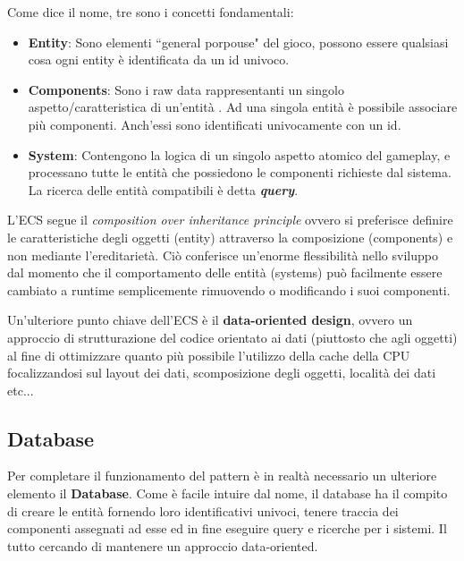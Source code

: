 Come dice il nome, tre sono i concetti fondamentali:

\begin{itemize}
	\item \textbf{Entity}: Sono elementi ``general porpouse" del gioco, possono essere qualsiasi cosa ogni entity è identificata da un id univoco.

	\item \textbf{Components}: Sono i raw data rappresentanti un singolo aspetto/caratteristica di un'entità . Ad una singola entità è possibile associare più componenti. Anch'essi sono identificati univocamente con un id.
	
	\item \textbf{System}: Contengono la logica di un singolo aspetto atomico del gameplay, e processano tutte le entità che possiedono le componenti richieste dal sistema. La ricerca delle entità compatibili è detta \textbf{\textit{query}}.
\end{itemize}

L'ECS segue il \textit{composition over inheritance principle} ovvero si preferisce definire le caratteristiche degli oggetti (entity) attraverso la composizione (components) e non mediante l'ereditarietà. Ciò conferisce un'enorme flessibilità nello sviluppo dal momento che il comportamento delle entità (systems) può facilmente essere cambiato a runtime semplicemente rimuovendo o modificando i suoi componenti.

Un'ulteriore punto chiave dell'ECS è il \textbf{data-oriented design}, ovvero un approccio di strutturazione del codice orientato ai dati (piuttosto che agli oggetti) al fine di ottimizzare quanto più possibile l'utilizzo della cache della CPU focalizzandosi sul layout dei dati, scomposizione degli oggetti, località dei dati etc...

\subsection{Database}
Per completare il funzionamento del pattern è in realtà necessario un ulteriore elemento il \textbf{Database}. Come è facile intuire dal nome, il database ha il compito di creare le entità fornendo loro identificativi univoci, tenere traccia dei componenti assegnati ad esse ed in fine eseguire query e ricerche per i sistemi. Il tutto cercando di mantenere un approccio data-oriented.

